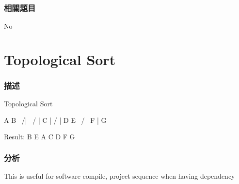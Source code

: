 \subsubsection{相關題目}
No

\section{Topological Sort} %
\label{sec:topological-sort}


\subsubsection{描述}
Topological Sort
\begin{Code}
  A     B
   \   /|
    \ / |
     C  |
    /   |
   D    E
    \  /
     \
      F
      |
      G
\end{Code}

Result: B E A C D F G



\subsubsection{分析}
This is useful for software compile, project sequence when having dependency


